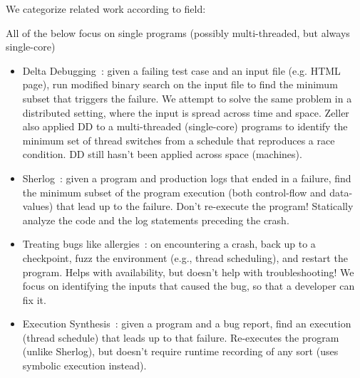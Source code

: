 We categorize related work according to field:

All of the below focus on single programs (possibly multi-threaded, but always single-core)
\begin{itemize}
\item Delta Debugging~\cite{Zeller:2002:SIF:506201.506206}: given a failing test case and an input file (e.g. HTML page), run modified binary search on the input file to find the minimum subset that triggers the failure. We attempt to solve the same problem in a distributed setting, where the input is spread across time and space. Zeller also applied DD to a multi-threaded (single-core) programs to identify the minimum set of thread switches from a schedule that reproduces a race condition. DD still hasn't been applied across space (machines).
\item Sherlog~\cite{Yuan:2010:SED:1736020.1736038}: given a program and production logs that ended in a failure, find the minimum subset of the program execution (both control-flow and data-values) that lead up to the failure. Don't re-execute the program! Statically analyze the code and the log statements preceding the crash.
\item Treating bugs like allergies~\cite{qin2005rx}: on encountering a crash, back up to a checkpoint, fuzz the environment (e.g., thread scheduling), and restart the program. Helps with availability, but doesn't help with troubleshooting! We focus on identifying the inputs that caused the bug, so that a developer can fix it.
\item Execution Synthesis~\cite{Zamfir:2010:EST:1755913.1755946}: given a program and a bug report, find an
execution (thread schedule) that leads up to that failure. Re-executes the
program (unlike Sherlog), but doesn't require runtime recording of any sort
(uses symbolic execution instead).
\end{itemize}

